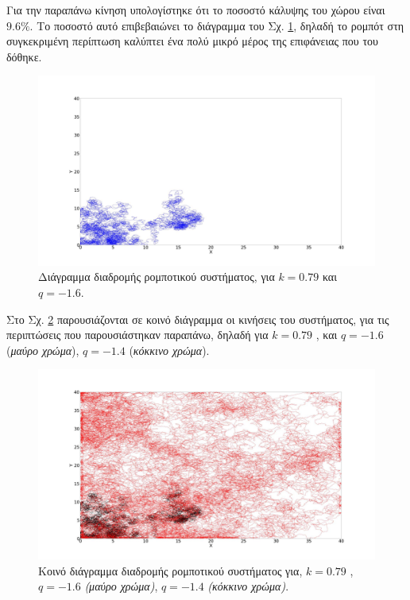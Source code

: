 Για την παραπάνω κίνηση υπολογίστηκε ότι το ποσοστό κάλυψης του χώρου είναι
$9.6 \% $. Το ποσοστό αυτό επιβεβαιώνει το διάγραμμα του Σχ.  \ref{f:g73}, δηλαδή το ρομπότ στη συγκεκριμένη περίπτωση καλύπτει ένα πολύ μικρό μέρος της επιφάνειας που του δόθηκε.

\begin{figure}[ht]
	\centering
	\includegraphics[width=1\linewidth]{LateX images/log/q/g3-1.6}
	\caption{Διάγραμμα διαδρομής ρομποτικού συστήματος, για $k = 0.79$ και $q = -1.6$.}
	\label{f:g73}	
\end{figure}


Στο Σχ. \ref{f:g74} παρουσιάζονται σε κοινό διάγραμμα οι κινήσεις του συστήματος, για τις
περιπτώσεις που παρουσιάστηκαν παραπάνω, δηλαδή για $k=0.79$ , και $q = -1.6$ (\emph{μαύρο χρώμα}), $q = -1.4$  (\emph{κόκκινο χρώμα}).

\begin{figure}[ht]
	\centering
	\includegraphics[width=1\linewidth]{LateX images/log/q/g3}
	\caption{Κοινό διάγραμμα διαδρομής ρομποτικού συστήματος για, $k = 0.79$ , $q = -1.6$ \emph{(μαύρο χρώμα)}, $q = -1.4$  \emph{(κόκκινο χρώμα)}.}
	\label{f:g74}	
\end{figure}

